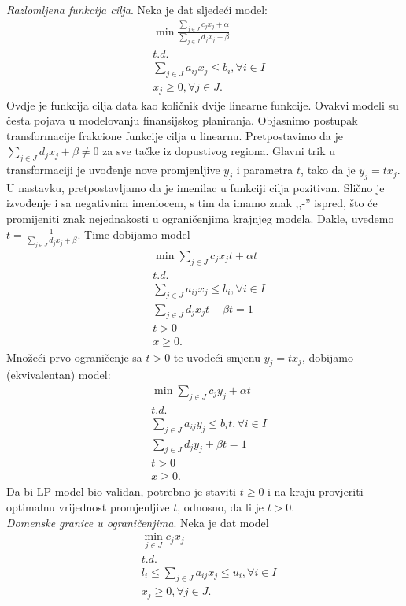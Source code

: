 \documentclass[a4paper, utf8, 11pt, colorlinks]{book}
\theoremstyle{definition}
\begin{document}
\emph{Razlomljena funkcija cilja}. Neka je dat sljedeći model:
\begin{align*}
	& \min \frac{\sum_{j \in J} c_j x_j + \alpha}{ \sum_{j \in J} d_j x_j + \beta} \\
		& t.d. \nonumber \\
	& \sum_{j \in J} a_{ij} x_j \leq b_i,  \forall i \in I \\
	& x_j \geq 0, \forall j \in J.
\end{align*}
Ovdje je funkcija cilja data kao količnik dvije linearne funkcije. Ovakvi modeli su česta pojava u modelovanju finansijskog planiranja. Objasnimo postupak transformacije frakcione funkcije cilja u linearnu. Pretpostavimo da je $\sum_{j \in J}d_j x_j + \beta \neq 0$ za sve tačke iz dopustivog regiona. Glavni trik u transformaciji je uvođenje nove promjenljive $y_j$ i parametra $t$, tako da je $y_j = t x_j$. U nastavku, pretpostavljamo da je imenilac u funkciji cilja pozitivan. Slično je izvođenje i sa negativnim imeniocem, s tim da imamo znak ,,-'' ispred, što će promijeniti znak nejednakosti u ograničenjima krajnjeg modela. Dakle, uvedemo $t = \frac{1}{\sum_{j \in J} d_j x_j + \beta }$. Time dobijamo model
\begin{align*}
	&\min \sum_{j \in J} c_j x_j t + \alpha t \\
	& t.d. \nonumber \\
	&\sum_{j \in J} a_{ij} x_j \leq b_i,  \forall i \in I \\
	& \sum_{j \in J} d_j x_j t + \beta t = 1 \\
	& t > 0 \\
	& x \geq 0.
\end{align*}
Množeći prvo ograničenje sa $t>0$ te uvodeći smjenu $y_j = t x_j$, dobijamo (ekvivalentan)  model:
\begin{align*}
	&\min \sum_{j \in J} c_j y_j + \alpha t \\
		& t.d. \nonumber \\
	& \sum_{j \in J} a_{ij} y_j \leq b_i t,  \forall i \in I \\
	& \sum_{j \in J} d_j y_j + \beta t = 1 \\
	& t > 0 \\
	& x \geq 0.
\end{align*}
Da bi LP model bio validan, potrebno je staviti $t \geq 0$ i na kraju provjeriti optimalnu vrijednost promjenljive $t$, odnosno, da li je $t>0$.   \\
\emph{Domenske granice u ograničenjima}. Neka je dat model
\begin{align*}
	&\min_{j \in J } c_j x_j \\
	& t.d. \nonumber \\
	& l_i \leq \sum_{j \in J} a_{ij} x_j \leq u_i, \forall i\in I \\
	& x_j \geq 0, \forall j \in J.
\end{align*} 
\end{document}

